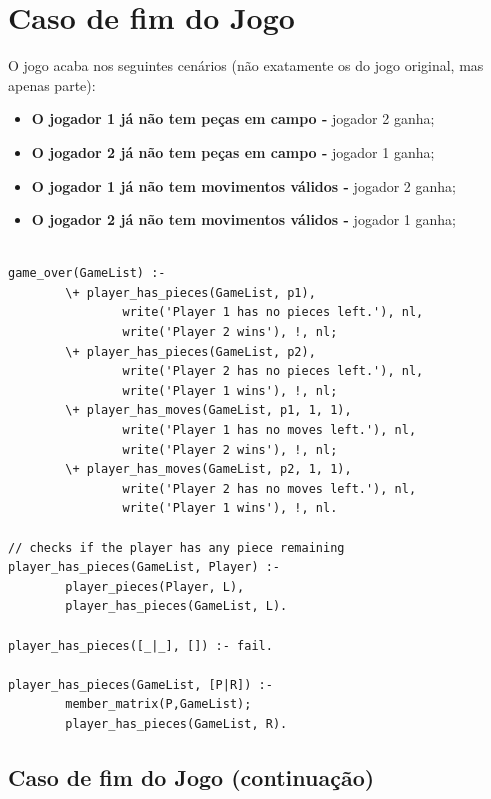 \newpage

\section{Caso de fim do Jogo}

O jogo acaba nos seguintes cenários (não exatamente os do jogo original, mas apenas parte):

\begin{itemize}
  \item{\textbf{O jogador 1 já não tem peças em campo -} jogador 2 ganha;}
  \item {\textbf{O jogador 2 já não tem peças em campo -} jogador 1 ganha;}
  \item{\textbf{O jogador 1 já não tem movimentos válidos -} jogador 2 ganha;}
  \item{\textbf{O jogador 2 já não tem movimentos válidos -} jogador 1 ganha;}
\end{itemize}

\begin{lstlisting}

game_over(GameList) :-
        \+ player_has_pieces(GameList, p1),
                write('Player 1 has no pieces left.'), nl,
                write('Player 2 wins'), !, nl;
        \+ player_has_pieces(GameList, p2),
                write('Player 2 has no pieces left.'), nl,
                write('Player 1 wins'), !, nl;
        \+ player_has_moves(GameList, p1, 1, 1),
                write('Player 1 has no moves left.'), nl,
                write('Player 2 wins'), !, nl;
        \+ player_has_moves(GameList, p2, 1, 1),
                write('Player 2 has no moves left.'), nl,
                write('Player 1 wins'), !, nl.

// checks if the player has any piece remaining
player_has_pieces(GameList, Player) :-
        player_pieces(Player, L),
        player_has_pieces(GameList, L).

player_has_pieces([_|_], []) :- fail.

player_has_pieces(GameList, [P|R]) :-
        member_matrix(P,GameList);
        player_has_pieces(GameList, R).

\end{lstlisting}

\newpage

\subsection{Caso de fim do Jogo (continuação)}

